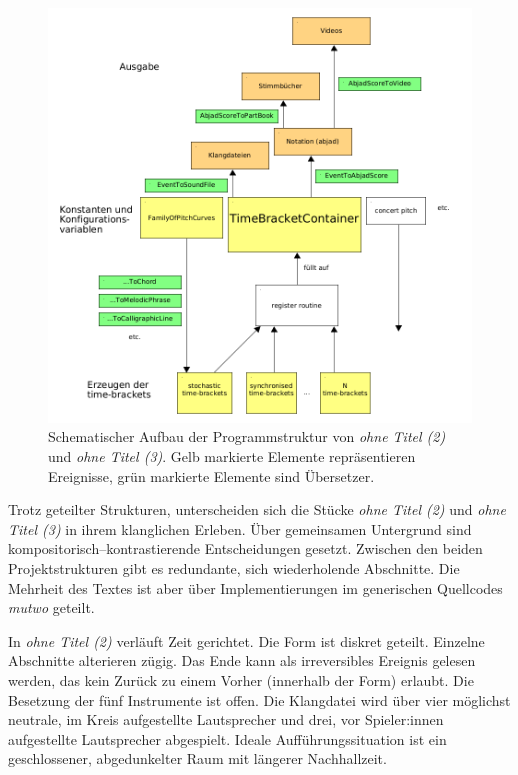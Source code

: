 \documentclass[12pt,a4paper,ngerman]{article}
\begin{document}
\begin{figure}[h!]
    \begin{center}
        \includegraphics[scale=0.42]{pictures/ohne-titel-mutwo-structure.png}
    \end{center}
    \caption{%
        Schematischer Aufbau der Programmstruktur von \emph{ohne Titel (2)} und  \emph{ohne Titel (3)}.
        Gelb markierte Elemente repräsentieren Ereignisse, grün markierte Elemente sind Übersetzer.
    }
    \label{fig:ohneTitelMutwoStructure}
\end{figure}


Trotz geteilter Strukturen, unterscheiden sich die Stücke \emph{ohne Titel (2)} und  \emph{ohne Titel (3)} in ihrem klanglichen Erleben.
Über gemeinsamen Untergrund sind kompositorisch--kontrastierende Entscheidungen gesetzt.
Zwischen den beiden Projektstrukturen gibt es redundante, sich wiederholende Abschnitte.
Die Mehrheit des Textes ist aber über Implementierungen im generischen Quellcodes \emph{mutwo} geteilt.

\smallskip

In \emph{ohne Titel (2)} verläuft Zeit gerichtet.
Die Form ist diskret geteilt.
Einzelne Abschnitte alterieren zügig.
Das Ende kann als irreversibles Ereignis gelesen werden, das kein Zurück zu einem Vorher (innerhalb der Form) erlaubt.
Die Besetzung der fünf Instrumente ist offen.
Die Klangdatei wird über vier möglichst neutrale, im Kreis aufgestellte Lautsprecher und drei, vor Spieler:innen aufgestellte Lautsprecher abgespielt.
Ideale Aufführungssituation ist ein geschlossener, abgedunkelter Raum mit längerer Nachhallzeit.
\end{document}
